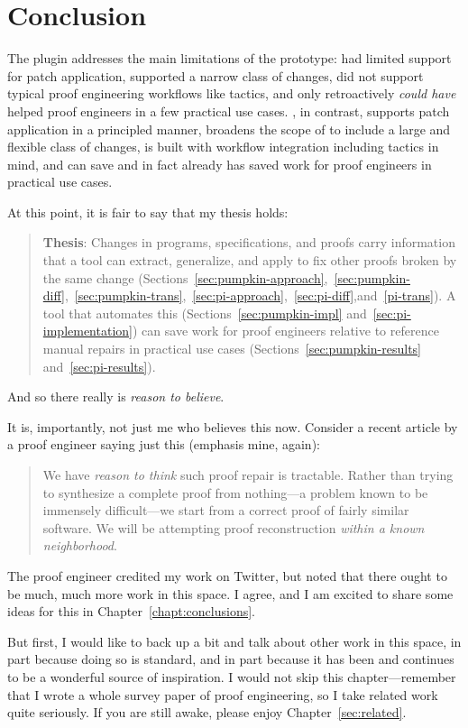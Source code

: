 \section{Conclusion}

The \toolnamec plugin addresses the main limitations of the \sysname prototype:
\sysname had limited support for patch application,
supported a narrow class of changes,
did not support typical proof engineering workflows like tactics,
and only retroactively \textit{could have} helped proof engineers in a few practical use cases.
\toolnamec, in contrast, supports patch application in a principled manner,
broadens the scope of \sysnamelong to include a large and flexible class of changes,
is built with workflow integration including tactics in mind,
and can save and in fact already has saved work for proof engineers in practical use cases.

At this point, it is fair to say that my thesis holds:

\begin{quote}
\textbf{Thesis}: Changes in programs, specifications, and proofs carry information that a tool can extract, generalize, and apply to fix other proofs broken by the same change (Sections~\ref{sec:pumpkin-approach},~\ref{sec:pumpkin-diff},~\ref{sec:pumpkin-trans},~\ref{sec:pi-approach},~\ref{sec:pi-diff},and~\ref{pi-trans}). A tool that automates this (Sections~\ref{sec:pumpkin-impl} and~\ref{sec:pi-implementation}) can save work for proof engineers relative to reference manual repairs in 
practical use cases (Sections~\ref{sec:pumpkin-results} and~\ref{sec:pi-results}).
\end{quote}
And so there really is \textit{reason to believe}. %

It is, importantly, not just me who believes this now.
Consider a recent article by a proof engineer saying just this (emphasis mine, again): %

\begin{quote}
We have \textit{reason to think} such proof repair is tractable. Rather than trying to synthesize a complete proof from nothing---a problem known to be immensely difficult---we 
start from a correct proof of fairly similar software. We will be attempting proof reconstruction \textit{within a known neighborhood}.
\end{quote}
The proof engineer credited my work on Twitter, %
but noted that there ought to be much, much more work in this space.
I agree, and I am excited to share some ideas for this in Chapter~\ref{chapt:conclusions}.

But first, I would like to back up a bit and talk about other work in this space,
in part because doing so is standard, and in part because it has been and continues to be a wonderful source of inspiration.
I would not skip this chapter---remember that I wrote a whole survey paper of proof engineering,
so I take related work quite seriously.
If you are still awake, please enjoy Chapter~\ref{sec:related}.
